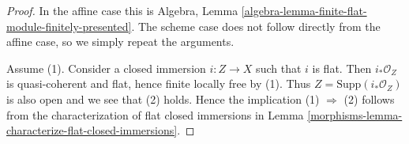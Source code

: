 \begin{proof}

In the affine case this is
Algebra, Lemma \ref{algebra-lemma-finite-flat-module-finitely-presented}.
The scheme case does not follow directly from the affine case, so we
simply repeat the arguments.

\medskip\noindent
Assume (1). Consider a closed immersion $i : Z \to X$ such that $i$ is flat.
Then $i_*\mathcal{O}_Z$ is quasi-coherent and flat, hence finite locally
free by (1). Thus $Z = \text{Supp}(i_*\mathcal{O}_Z)$ is also open and we see
that (2) holds. Hence the implication (1) $\Rightarrow$ (2) follows from
the characterization of flat closed immersions in
Lemma \ref{morphisms-lemma-characterize-flat-closed-immersions}.


\end{proof}
